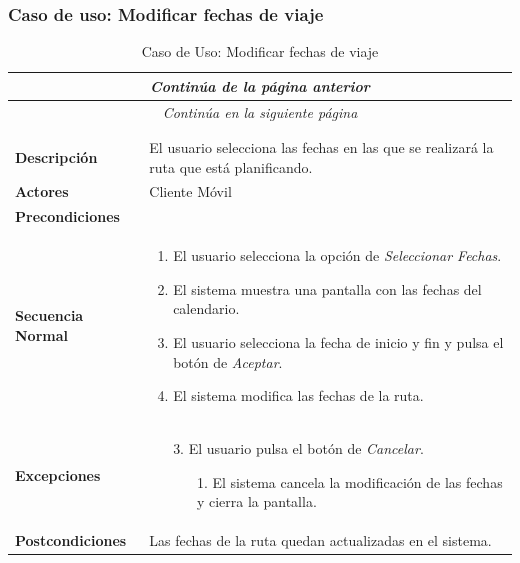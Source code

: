 \newpage
\subsubsection*{Caso de uso: Modificar fechas de viaje}
\begin{longtable}{| p{4cm} | p{10cm} |}
\endfirsthead
\multicolumn{2}{c}{\textit{Continúa de la página anterior}}\\[12pt]
\hline
\endhead
\hline
\multicolumn{2}{c}{\textit{Continúa en la siguiente página}} \\
\endfoot
\hline
\caption{Caso de Uso: Modificar fechas de viaje}\label{fig:1}\\
\endlastfoot


\hline
\multicolumn{2}{|c|}{\textbf{CU$<$07$>$ - Modificar Fechas de Viaje}} \\

\hline
\textbf{Descripción} &
El usuario selecciona las fechas en las que se realizará la ruta que está planificando.\\

\hline
\textbf{Actores} &
Cliente Móvil\\

\hline
\textbf{Precondiciones} &
\\

\hline
\textbf{Secuencia Normal} &\mbox{}\par\vspace{-\baselineskip}
\begin{enumerate}[leftmargin=0.7cm, topsep=0.1cm]
\item El usuario selecciona la opción de \textit{Seleccionar Fechas}.
\item El sistema muestra una pantalla con las fechas del calendario.
\item El usuario selecciona la fecha de inicio y fin y pulsa el botón de \textit{Aceptar}.
\item El sistema modifica las fechas de la ruta.
\end{enumerate}\\

\hline
\textbf{Excepciones} &\mbox{}\par\vspace{-\baselineskip}
\begin{enumerate}[leftmargin=0.9cm, topsep=0.1cm]
\item[3.] El usuario pulsa el botón de \textit{Cancelar}.
	\begin{itemize}
	\item[1.] El sistema cancela la modificación de las fechas y cierra la pantalla.
	\end{itemize}
\end{enumerate}
\\

\hline
\textbf{Postcondiciones} & 
Las fechas de la ruta quedan actualizadas en el sistema.\\
\hline
\end{longtable}



